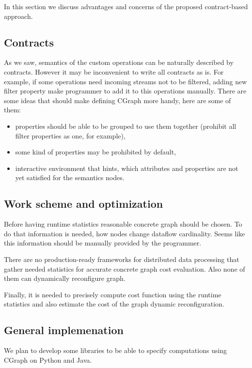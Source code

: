 In this section we discuss advantages and concerns of the proposed contract-based approach.

\subsection{Contracts}

As we saw, semantics of the custom operations can be naturally described by contracts.
However it may be inconvenient to write all contracts as is.
For example, if some operations need incoming streams not to be filtered, adding new filter property make programmer to add it to this operations manually.
There are some ideas that should make defining CGraph more handy, here are some of them:
\begin{itemize}
    \item properties should be able to be grouped to use them together (prohibit all filter properties as one, for example),
    \item some kind of properties may be prohibited by default,
    \item interactive environment that hints, which attributes and properties are not yet satisfied for the semantics nodes.
\end{itemize}

\subsection{Work scheme and optimization}

Before having runtime statistics reasonable concrete graph should be chosen.
To do that information is needed, how nodes change dataflow cardinality.
Seems like this information should be manually provided by the programmer.

There are no production-ready frameworks for distributed data processing that gather needed statistics for accurate concrete graph cost evaluation.
Also none of them can dynamically reconfigure graph.

Finally, it is needed to precisely compute cost function using the runtime statistics and also estimate the cost of the graph dynamic reconfiguration.

\subsection{General implemenation}

We plan to develop some libraries to be able to specify computations using CGraph on Python and Java.
